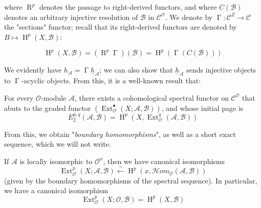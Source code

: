 where $\operatorname{R}^p$ denotes the passage to right-derived functors, and where $C(\mathcal{B})$ denotes an arbitrary injective resolution of $\mathcal{B}$ in $\mathcal{C}^\mathcal{O}$.
We denote by $\operatorname{\Gamma}\colon\mathcal{C}^Z\to\mathcal{C}$ the "sections" functor;
recall that its right-derived functors are denoted by $B\mapsto\operatorname{H}^p(X,\mathcal{B})$:

\begin{equation}\tag{1.3}\label{fga1-equation-1.3}
    \operatorname{H}^p(X,\mathcal{B}) = (\operatorname{R}^p\operatorname{\Gamma})(\mathcal{B}) = \operatorname{H}^p(\operatorname{\Gamma}(C(\mathcal{B})))
\end{equation}

We evidently have $h_\mathcal{A}=\operatorname{\Gamma}\underline{h}_\mathcal{A}$;
we can also show that $\underline{h}_\mathcal{A}$ sends injective objects to $\operatorname{\Gamma}$-acyclic objects.
From this, it is a well-known result that:

\begin{proposition}\label{fga1-proposition-1}
    For every $\mathcal{O}$-module $\mathcal{A}$, there exists a cohomological spectral functor on $\mathcal{C}^\mathcal{O}$ that abuts to the graded functor $(\operatorname{Ext}_\mathcal{O}^\bullet(X;\mathcal{A},\mathcal{B}))$, and whose initial page is
    \begin{equation}\tag{1.4}\label{fga1-equation-1.4}
        E_2^{p,q}(\mathcal{A},\mathcal{B})= \operatorname{H}^p(X,\operatorname{Ext}_\mathcal{O}^q(\mathcal{A},\mathcal{B}))
    \end{equation}
\end{proposition}

From this, we obtain "\emph{boundary homomorphisms}", as well as a short exact sequence, which we will not write.

\begin{corollary}\label{fga1-proposition-1-corollary-1}
    If $\mathcal{A}$ is locally isomorphic to $\mathcal{O}^n$, then we have canonical isomorphisms
    \begin{equation}\tag{1.5}\label{fga1-equation-1.5}
        \operatorname{Ext}_\mathcal{O}^p(X;\mathcal{A},\mathcal{B}) \xleftarrow{\sim} \operatorname{H}^p(x,\mathcal{H}om_\mathcal{O}(\mathcal{A},\mathcal{B}))
    \end{equation}
    (given by the boundary homomorphisms of the spectral sequence). In particular, we have a canonical isomorphism
    \begin{equation}\tag{1.6}\label{fga1-equation-1.6}
        \operatorname{Ext}_\mathcal{O}^p(X;\mathcal{O},\mathcal{B}) = \operatorname{H}^p(X,\mathcal{B})
    \end{equation}
\end{corollary}


